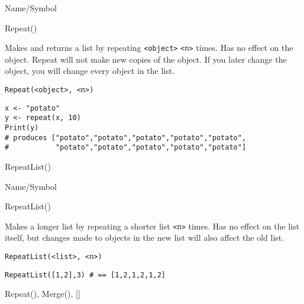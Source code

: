 \rl


\begin{desc}{Name/Symbol}
\item[Name/Symbol] 	Repeat()

\item[Description] 	Makes and returns a list by repeating \verb+<object>+ \verb+<n>+ times. 
		Has no effect on the object. Repeat will not make new copies 
		of the object. If you later change the object, 
		you will change every object in the list.

\item[Usage]       	
\begin{verbatim}
Repeat(<object>, <n>)
\end{verbatim}
	    	
\item[Example]     	
\begin{verbatim}
x <- "potato"
y <- repeat(x, 10)
Print(y)
# produces ["potato","potato","potato","potato","potato", 
#           "potato","potato","potato","potato","potato"]
\end{verbatim}
	     	     
\item[See Also]    	RepeatList()
\end{desc}

\rl


\begin{desc}{Name/Symbol}
\item[Name/Symbol] 	RepeatList()

\item[Description]  	Makes a longer list by repeating a shorter list \verb+<n>+ times. 
	Has no effect on the list itself, but changes made to objects 
	in the new list will also affect the old list.

\item[Usage]       	
\begin{verbatim}
RepeatList(<list>, <n>)
\end{verbatim}

\item[Example]     	
\begin{verbatim}
RepeatList([1,2],3) # == [1,2,1,2,1,2]
\end{verbatim}

\item[See Also]    	Repeat(), Merge(), []
\end{desc}

\rl


